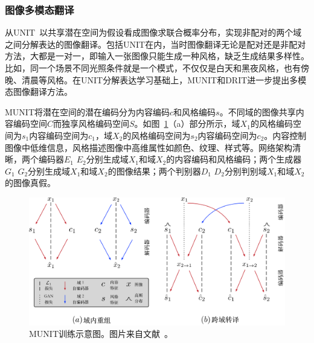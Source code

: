 

\subsubsection{图像多模态翻译}
从UNIT~\cite{liu2017unsupervised}以共享潜在空间为假设看成图像求联合概率分布，实现非配对的两个域之间分解表达的图像翻译。包括UNIT在内，当时图像翻译无论是配对还是非配对方法，大都是一对一，即输入一张图像只能生成一种风格，缺乏生成结果多样性。比如，同一个场景不同光照条件就是一个模式，不仅仅是白天和黑夜风格，也有傍晚、清晨等风格。在UNIT分解表达学习基础上，MUNIT和DRIT进一步提出多模态图像翻译方法。

MUNIT将潜在空间的潜在编码分为内容编码$c$和风格编码$s$。不同域的图像共享内容编码空间$C$而独享风格编码空间$S$。如图~\ref{fig:munit}（a）部分所示，域$X_1$的风格编码空间为$s_1$内容编码空间为$c_1$，域$X_2$的风格编码空间为$s_2$内容编码空间为$c_2$。内容控制图像中低维信息，风格描述图像中高维属性如颜色、纹理、样式等。网络架构清晰，两个编码器$E_1$ $E_2$分别生成域$X_1$和域$X_2$的内容编码和风格编码；两个生成器$G_1$ $G_2$分别生成域$X_1$和域$X_2$的图像结果；两个判别器$D_1$ $D_2$分别判别域$X_1$和域$X_2$的图像真假。

\begin{figure}[ht]
    \centering
	\includegraphics[width=\textwidth]{figures/munit.pdf}
	\caption{MUNIT训练示意图。图片来自文献~\cite{huang2018multimodal}。}
	\label{fig:munit}
\end{figure}

